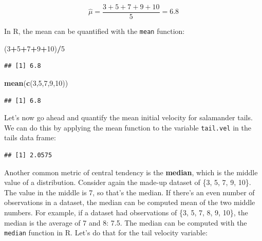 \documentclass[
]{book}
\newenvironment{Shaded}{\begin{snugshade}}{\end{snugshade}}
\newcommand{\DecValTok}[1]{\textcolor[rgb]{0.00,0.00,0.81}{#1}}
\newcommand{\FunctionTok}[1]{\textcolor[rgb]{0.13,0.29,0.53}{\textbf{#1}}}
\newcommand{\NormalTok}[1]{#1}
\newcommand{\SpecialCharTok}[1]{\textcolor[rgb]{0.81,0.36,0.00}{\textbf{#1}}}
\begin{document}
\[
\hat{\mu} = \frac{3+5+7+9+10}{5}=6.8
\]

In R, the mean can be quantified with the \texttt{mean} function:

\begin{Shaded}
\begin{Highlighting}[]
\NormalTok{(}\DecValTok{3}\SpecialCharTok{+}\DecValTok{5}\SpecialCharTok{+}\DecValTok{7}\SpecialCharTok{+}\DecValTok{9}\SpecialCharTok{+}\DecValTok{10}\NormalTok{)}\SpecialCharTok{/}\DecValTok{5}
\end{Highlighting}
\end{Shaded}

\begin{verbatim}
## [1] 6.8
\end{verbatim}

\begin{Shaded}
\begin{Highlighting}[]
\FunctionTok{mean}\NormalTok{(}\FunctionTok{c}\NormalTok{(}\DecValTok{3}\NormalTok{,}\DecValTok{5}\NormalTok{,}\DecValTok{7}\NormalTok{,}\DecValTok{9}\NormalTok{,}\DecValTok{10}\NormalTok{))}
\end{Highlighting}
\end{Shaded}

\begin{verbatim}
## [1] 6.8
\end{verbatim}

Let's now go ahead and quantify the mean initial velocity for salamander tails. We can do this by applying the mean function to the variable \texttt{tail.vel} in the tails data frame:

\begin{Shaded}
\end{Shaded}

\begin{verbatim}
## [1] 2.0575
\end{verbatim}

Another common metric of central tendency is the \textbf{median}, which is the middle value of a distribution. Consider again the made-up dataset of \{3, 5, 7, 9, 10\}. The value in the middle is 7, so that's the median. If there's an even number of observations in a dataset, the median can be computed mean of the two middle numbers. For example, if a dataset had observations of \{3, 5, 7, 8, 9, 10\}, the median is the average of 7 and 8: 7.5. The median can be computed with the \texttt{median} function in R. Let's do that for the tail velocity variable:
\end{document}
